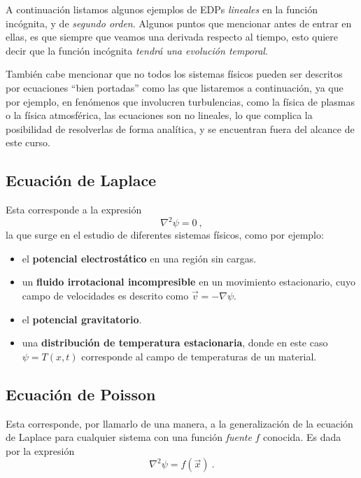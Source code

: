 A continuación listamos algunos ejemplos de EDPs \emph{lineales} en la función incógnita, y de \emph{segundo orden}. Algunos puntos que mencionar antes de entrar en ellas, es que siempre que veamos una derivada respecto al tiempo, esto quiere decir que la función incógnita \emph{tendrá una evolución temporal}. 

También cabe mencionar que no todos los sistemas físicos pueden ser descritos por ecuaciones ``bien portadas'' como las que listaremos a continuación, ya que por ejemplo, en fenómenos que involucren turbulencias, como la física de plasmas o la física atmosférica, las ecuaciones son no lineales, lo que complica la posibilidad de resolverlas de forma analítica, y se encuentran fuera del alcance de este curso.

\subsection{Ecuación de Laplace}

Esta corresponde a la expresión
\begin{equation}
    \nabla^2 \psi = 0 \ ,
\end{equation}
la que surge en el estudio de diferentes sistemas físicos, como por ejemplo:
\begin{itemize}
    \item el \textbf{potencial electrostático} en una región sin cargas. 
    \item un \textbf{fluido irrotacional incompresible} en un movimiento estacionario, cuyo campo de velocidades es descrito como $\vec{v} = -\nabla \psi$.
    \item el \textbf{potencial gravitatorio}.
    \item una \textbf{distribución de temperatura estacionaria}, donde en este caso $\psi = T(x,t)$ corresponde al campo de temperaturas de un material.
\end{itemize}

\subsection{Ecuación de Poisson}

Esta corresponde, por llamarlo de una manera, a la generalización de la ecuación de Laplace para cualquier sistema con una función \emph{fuente} $f$ conocida. Es dada por la expresión
\begin{equation}
    \nabla^2\psi = f(\vec{x}) \ .
\end{equation}

